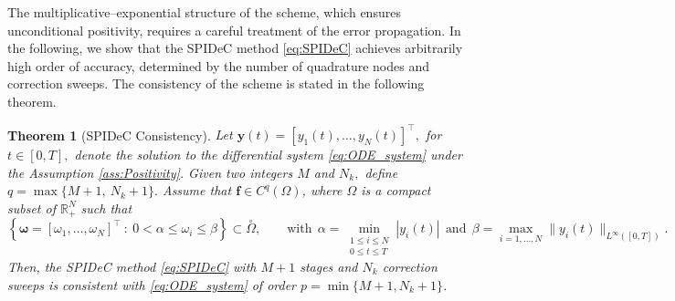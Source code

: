 \documentclass[a4paper,num-refs]{oup-contemporary-spidec}
\newtheorem{theorem}{Theorem}[section]
\begin{document}
The multiplicative--exponential structure of the scheme, which ensures unconditional positivity, requires a careful treatment of the error propagation. In the following, we show that the SPIDeC method \eqref{eq:SPIDeC} achieves arbitrarily high order of accuracy, determined by the number of quadrature nodes and correction sweeps. The consistency of the scheme is stated in the following theorem.
\begin{theorem}[SPIDeC Consistency]\label{thm:Consistency}
    Let $\bm{y}(t)=[y_1(t),\dots,y_N(t)]^\top, $ for $t\in[0,T],$ denote the solution to the differential system \eqref{eq:ODE_system} under the Assumption \ref{ass:Positivity}. Given two integers $M$ and $N_k,$ define $q=\max\{M+1, \ N_k+1\}.$ Assume that $\bm f \in C^{q}(\Omega)$, where $\Omega$ is a compact subset of $\mathbb{R}_{+}^{N}$ such that
    \begin{equation}\label{eq:def_Omega}
         \left\{\bm{\omega}=[\omega_1,\dots,\omega_N]^\top \ : \ 0<\alpha\leq \omega_i \leq \beta\right\}\subset \stackrel{\circ}{\Omega}, \qquad \text{with} \ \ \alpha=\!\min_{\substack{1\leq i \leq N \\ 0\leq t \leq T }}|y_i(t)| \ \ \text{and} \ \  \beta =\! \max_{i=1,\dots,N}\|y_i(t)\|_{L^\infty([0,T])}.
    \end{equation}
    Then, the SPIDeC method \eqref{eq:SPIDeC} with $M+1$ stages and $N_k$ correction sweeps is consistent with \eqref{eq:ODE_system} of order $p=\min\{M+1,N_k+1\}$.
\end{theorem}
\end{document}
